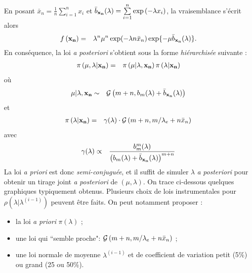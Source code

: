 \begin{rep}
En posant
$\bar{x}_n  =  \frac{1}{n}\sum\limits_{i=1}^n x_i$ et 
$\bar{b}_{{\bf x_n}}(\lambda)  =  \sum\limits_{i=1}^n \exp\left(-\lambda x_i\right)$, 
la vraisemblance s'écrit alors
\begin{eqnarray*}
f\left({\bf x_n}\right) & = & \lambda^n \mu^n \exp(-\lambda n\bar{x}_n) \exp\{-\mu\bar{b}_{{\bf x_n}}(\lambda)\}.
\end{eqnarray*}
En conséquence, la loi {\it a posteriori} s'obtient sous la forme \emph{hiérarchisée} suivante :
\begin{eqnarray*}
\pi\left(\mu,\lambda|{\bf x_n}\right) & = & \pi\left(\mu|\lambda,{\bf x_n}\right) \pi\left(\lambda|{\bf x_n}\right)
\end{eqnarray*}
où
\begin{eqnarray*}
\mu|\lambda,{\bf x_n} & \sim & {\cal{G}}\left(m+n,b_m(\lambda) + \bar{b}_{{\bf x_n}}(\lambda)\right)
\end{eqnarray*}
et
\begin{eqnarray*}
\pi\left(\lambda|{\bf x_n}\right) & =  & %
\gamma(\lambda)\cdot {\cal{G}}\left(m+n,{m}/{\lambda_e} + n\bar{x}_n\right)
\end{eqnarray*}
avec
\begin{eqnarray*}
\gamma(\lambda) & \propto & \frac{b^m_m(\lambda)}{ \left(b_m(\lambda) + \bar{b}_{{\bf x_n}}(\lambda)\right)^{m+n}}
\end{eqnarray*}
La loi {\it a priori} est donc \emph{semi-conjuguée}, et il suffit de simuler $\lambda$ {\it a posteriori} pour obtenir un tirage joint {\it a posteriori} de $(\mu,\lambda)$. On trace ci-dessous quelques graphiques typiquement obtenus. Plusieurs choix de lois instrumentales pour $\rho(\lambda|\lambda^{(i-1)})$ peuvent être faits. On peut notamment proposer : 
\begin{itemize}
\item la loi {\it a priori} $\pi(\lambda)$ ; 
\item une loi qui ``semble proche": ${\cal{G}}\left(m+n,{m}/{\lambda_e} + n\bar{x}_n\right)$ ; 
\item une loi normale de moyenne $\lambda^{(i-1)}$ et de coefficient de variation petit (5\%) ou grand (25 ou 50\%).
\end{itemize}



\end{rep}
